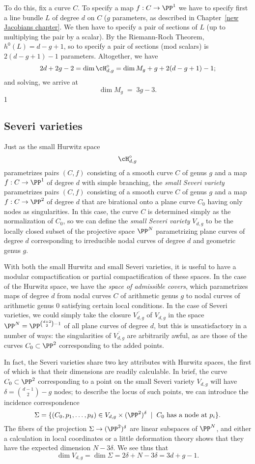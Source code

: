 To do this, fix a curve $C$. To specify a map $f : C \to \PP^1$ we have to specify first a line bundle $L$ of degree $d$ on $C$ ($g$ parameters, as described in Chapter~\ref{new Jacobians chapter}. We then have to specify a pair of sections of $L$ (up to multiplying the pair by a scalar). By the Riemann-Roch Theorem, $h^0(L) = d-g+1$, so to specify a pair of sections (mod scalars) is $2(d-g+1)-1$ parameters. Altogether, we have
$$
2d+2g-2 = \dim \cH^\circ_{d,g} = \dim M_g + g + 2(d-g+1)-1;
$$
and solving, we arrive at
$$
\dim M_g \; = \; 3g-3.
$$1

\subsection{Severi varieties}

Just as the small Hurwitz space $$\cH^\circ_{d,g}$$ parametrizes pairs $(C,f)$ consisting of a smooth curve $C$ of genus $g$ and a map $f : C \to \PP^1$ of degree $d$
with simple branching, the \emph{small Severi variety} parametrizes pairs $(C,f)$ consisting of a smooth curve $C$ of genus $g$ and a map $f : C \to \PP^2$ of degree $d$ that are birational onto a plane curve $C_0$ having only nodes as singularities. In this case, the curve $C$ is determined simply as the normalization of $C_0$, so we can define the \emph{small Severi variety} $V_{d,g}$ to be the locally closed subset of the projective space $\PP^N$ parametrizing plane curves of degree $d$ corresponding to irreducible nodal curves of degree $d$ and geometric genus $g$.

With both the small Hurwitz and small Severi varieties, it is useful to have a modular compactification or partial compactification of these spaces. In the case of the Hurwitz space, we have the \emph{space of admissible covers}, which parametrizes  maps of degree $d$ from nodal curves $C$ of arithmetic genus $g$ to nodal curves of arithmetic genus 0 satisfying certain local conditions. In the case of Severi varieties, we could simply take the closure $\overline{V_{d,g}}$ of $V_{d,g}$ in the space $\PP^N = \PP^{\binom{d+2}{2}-1}$ of all plane curves of degree $d$, but this is unsatisfactory in a number of ways: the singularities of $\overline{V_{d,g}}$ are arbitrarily awful, as are those of the curves $C_0 \subset \PP^2$ corresponding to the added points. 

In fact, the Severi varieties share two key attributes with Hurwitz spaces, the first of which is that their dimensions are readily calculable. In brief, the curve $C_0 \subset \PP^2$ corresponding to a point on the small Severi variety $V_{d,g}$ will have $\delta = \binom{d-1}{2} - g$ nodes; to describe the locus of such points, we can introduce the incidence correspondence
$$
\Sigma = \{(C_0,p_1,\dots,p_\delta) \in V_{d,g} \times (\PP^2)^\delta \; \mid \; C_0 \text{ has a node at $p_i$} \}.
$$
The fibers of the projection $\Sigma \to (\PP^2)^\delta$ are linear subspaces of $\PP^N$, and either a calculation in local coordinates or a little deformation theory shows that they have the expected dimension $N - 3\delta$. We see thus that
$$
\dim V_{d,g} = \dim \Sigma = 2\delta + N - 3\delta = 3d+g-1.
$$

